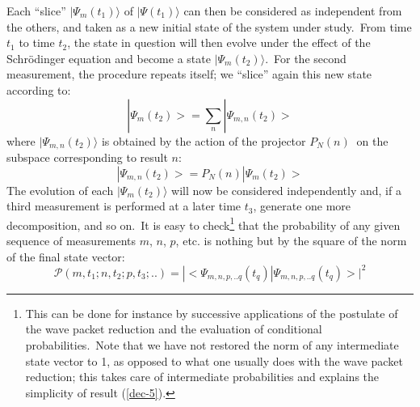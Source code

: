 \documentclass[12pt,onecolumn]{article}%
\begin{document}
Each ``slice'' $|\Psi_{m}(t_{1})\rangle$ of $|\Psi(t_{1})\rangle$ can then be
considered as independent from the others, and taken as a new initial state of
the system under study.\ From time $t_{1}$ to time $t_{2}$, the state in
question will then evolve under the effect of the Schr\"{o}dinger equation and
become a state $|\Psi_{m}(t_{2})\rangle$.\ For the second measurement, the
procedure repeats itself; we ``slice'' again this new state according to:%
\begin{equation}
|\Psi_{m}(t_{2})>=\sum_{n}|\Psi_{m,n}(t_{2})> \label{dec-3}%
\end{equation}
where $|\Psi_{m,n}(t_{2})\rangle$ is obtained by the action of the projector
$P_{N}(n)$ $\ $on the subspace corresponding to result $n$:%
\begin{equation}
|\Psi_{m,n}(t_{2})>=P_{N}(n)|\Psi_{m}(t_{2})> \label{dec-4}%
\end{equation}
The evolution of each $|\Psi_{m}(t_{2})\rangle$ will now be considered
independently and, if a third measurement is performed at a later time $t_{3}%
$, generate one more decomposition, and so on.\ It is easy to
check\footnote{This can be done for instance by successive applications of the
postulate of the wave packet reduction and the evaluation of conditional
probabilities.\ Note that we have not restored the norm of any intermediate
state vector to 1, as opposed to what one usually does with the wave packet
reduction; this takes care of intermediate probabilities and explains the
simplicity of result (\ref{dec-5}).} that the probability of any given
sequence of measurements $m$, $n$, $p$, etc. is nothing but by the square of
the norm of the final state vector:%
\begin{equation}
\mathcal{P}(m,t_{1};n,t_{2};p,t_{3};..)=|<\Psi_{m,n,p,..q}(t_{q})|
\Psi_{m,n,p,..q}(t_{q})>|^{2} \label{dec-5}%
\end{equation}
\end{document}
